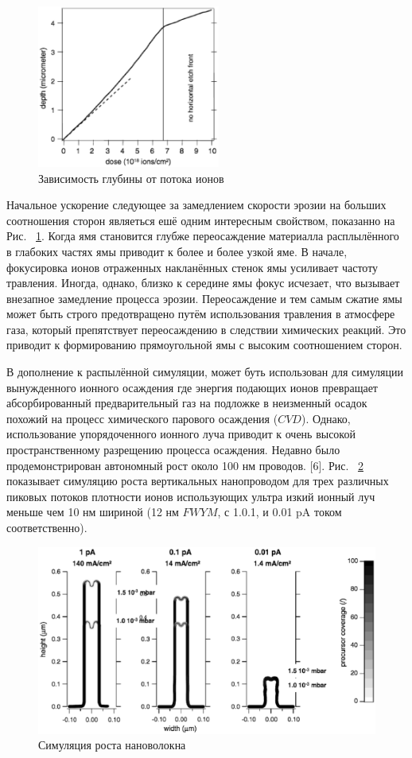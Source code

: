 \documentclass[a4paper,fontsize=12pt]{article}
\begin{document}
\begin{figure}[h]
    \centering
    \includegraphics[width=6cm]{images/part2/4.eps}
    \caption{Зависимость глубины от потока ионов}
    \label{fig:part2Depth}
\end{figure}


Начальное ускорение следующее за замедлением скорости эрозии на больших соотношения сторон являеться ешё одним интересным свойством, показанно на Рис. ~\ref{fig:part2Depth}. Когда ямя становится глубже переосаждение материалла расплылённого в глабоких частях ямы приводит к более и более узкой яме. В начале, фокусировка ионов отраженных накланённых стенок ямы усиливает частоту травления. Иногда, однако, близко к середине ямы фокус исчезает, что вызывает внезапное замедление процесса эрозии. Переосаждение и тем самым сжатие ямы может быть строго предотвращено путём использования травления в атмосфере газа, который препятствует переосаждению в следствии химических реакций. Это приводит к формированию прямоугольной ямы с высоким соотношением сторон.

В дополнение к распылённой симуляции, \ion{} может буть использован для симуляции вынужденного ионного осаждения где энергия подающих ионов превращает абсорбированный предварительный газ на подложке в неизменный осадок похожий на процесс химического парового осаждения ($CVD$). Однако, использование упорядоченного ионного луча приводит к очень высокой пространственному разрещению процесса осаждения. Недавно было продемонстрирован автономный рост около 100 нм проводов. [6]. Рис. ~\ref{fig:part2Growth} показывает симуляцию роста вертикальных нанопроводом для трех различных пиковых потоков плотности ионов использующих ультра изкий ионный луч меньше чем 10 нм шириной (12 нм  $FWYM$, с 1.0.1, и 0.01 pA током соответственно).

\begin{figure}[h]
    \centering
    \includegraphics[width=15cm]{images/part2/5.eps}
    \caption{Симуляция роста нановолокна}
    \label{fig:part2Growth}
\end{figure}
\end{document}
